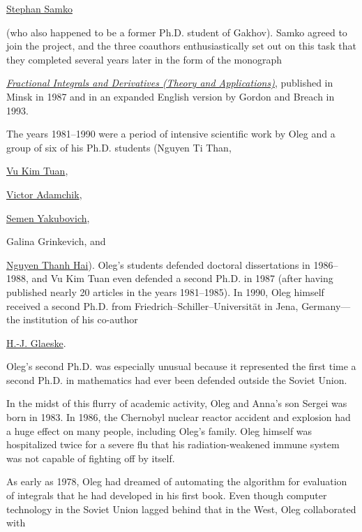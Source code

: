 \href{http://www.genealogy.ams.org/id.php?id=106361}{Stephan Samko}

(who also happened to be a former Ph.D. student of Gakhov). Samko agreed to join the project, and the three coauthors enthusiastically set out on this task that they completed several years later in the form of the monograph

\href{http://www.amazon.com/Fractional-Integrals-Derivatives-Theory-Applications/dp/2881248640}{\textit{Fractional Integrals and Derivatives (Theory and Applications)}}, published in Minsk in 1987 and in an expanded English version by Gordon and Breach in 1993. 



The years 1981–1990 were a period of intensive scientific work by Oleg and a group of six of his Ph.D. students (Nguyen Ti Than, 

\href{http://academic.research.microsoft.com/Author/12980097/vu-kim-tuan}{Vu Kim Tuan}, 

\href{http://www.cs.cmu.edu/~adamchik/}{Victor Adamchik}, 

\href{http://academic.research.microsoft.com/Author/54570726/semen-b-yakubovich}{Semen Yakubovich}, 

Galina Grinkevich, and 

\href{http://www.goodreads.com/author/show/573284.Thanh_Hai_Nguyen}{Nguyen Thanh Hai}). Oleg's students defended doctoral dissertations in 1986–1988, and Vu Kim Tuan even defended a second Ph.D. in 1987 (after having published nearly 20 articles in the years 1981–1985). In 1990, Oleg himself received a second Ph.D. from Friedrich–Schiller–Universit\"at in Jena, Germany—the institution of his co-author 

\href{http://www.mathnet.ru/eng/person38690}{H.-J. Glaeske}. 

Oleg's second Ph.D. was especially unusual because it represented the first time a second Ph.D. in mathematics had ever been defended outside the Soviet Union.



In the midst of this flurry of academic activity, Oleg and Anna's son Sergei was born in 1983. In 1986, the Chernobyl nuclear reactor accident and explosion had a huge effect on many people, including Oleg's family. Oleg himself was hospitalized twice for a severe flu that his radiation-weakened immune system was not capable of fighting off by itself.



As early as 1978, Oleg had dreamed of automating the algorithm for evaluation of integrals that he had developed in his first book. Even though computer technology in the Soviet Union lagged behind that in the West, Oleg collaborated with

